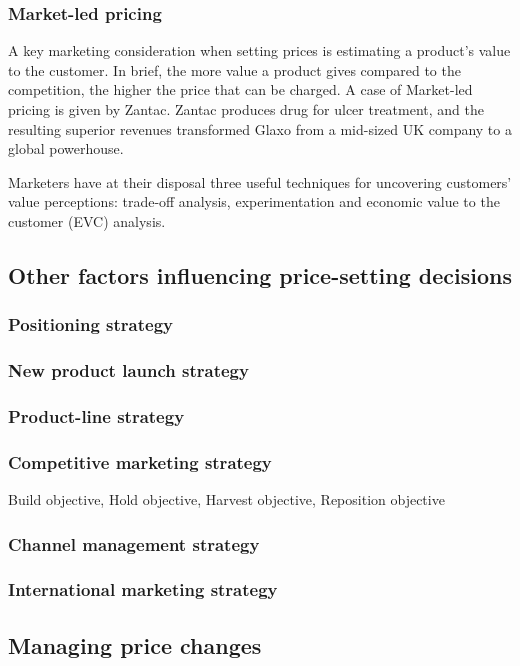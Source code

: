 \documentclass{article}
\begin{document}
\subsubsection{Market-led pricing}
A key marketing consideration when setting prices is estimating a product's value to the customer. In brief, the more value a product gives compared to the competition, the higher the price that can be charged. A case of Market-led pricing is given by Zantac. Zantac produces drug for ulcer treatment, and the resulting superior revenues transformed Glaxo from a mid-sized UK company to a global powerhouse.

Marketers have at their disposal three useful techniques for uncovering customers' value perceptions: trade-off analysis, experimentation and economic value to the customer (EVC) analysis.

\subsection{Other factors influencing price-setting decisions}
\subsubsection*{Positioning strategy}
\subsubsection*{New product launch strategy}
\subsubsection*{Product-line strategy}
\subsubsection*{Competitive marketing strategy}
Build objective, Hold objective, Harvest objective, Reposition objective

\subsubsection*{Channel management strategy}

\subsubsection*{International marketing strategy}

\subsection{Managing price changes}
\end{document}
